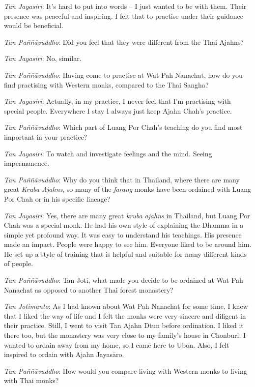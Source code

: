 \emph{Tan Jayasiri}: It's hard to put into words -- I just wanted to be
with them. Their presence was peaceful and inspiring. I felt that to
practise under their guidance would be beneficial.

\emph{Tan Paññāvuddho}‎: Did you feel that they were different from the
Thai Ajahns?

\emph{Tan Jayasiri}: No, similar.

\emph{Tan Paññāvuddho}‎: Having come to practise at Wat Pah Nanachat,
how do you find practising with Western monks, compared to the Thai
Sangha?

\emph{Tan Jayasiri}: Actually, in my practice, I never feel that I'm
practising with special people. Everywhere I stay I always just keep
Ajahn Chah's practice.

\emph{Tan Paññāvuddho}‎: Which part of Luang Por Chah's teaching do you
find most important in your practice?

\emph{Tan Jayasiri}: To watch and investigate feelings and the mind.
Seeing impermanence.

\emph{Tan Paññāvuddho}‎: Why do you think that in Thailand, where there
are many great \emph{Kruba Ajahns‎‎}, so many of the \emph{farang} monks
have been ordained with Luang Por Chah or in his specific lineage?

\emph{Tan Jayasiri}: Yes, there are many great \emph{kruba}
\emph{ajahns} in Thailand, but Luang Por Chah was a special monk. He had
his own style of explaining the Dhamma in a simple yet profound way. It
was easy to understand his teachings. His presence made an impact.
People were happy to see him. Everyone liked to be around him. He set up
a style of training that is helpful and suitable for many different
kinds of people.

\emph{Tan Paññāvuddho}‎: Tan Joti, what made you decide to be ordained
at Wat Pah Nanachat as opposed to another Thai forest monastery?

\emph{Tan Jotimanto}: As I had known about Wat Pah Nanachat for some
time, I knew that I liked the way of life and I felt the monks were very
sincere and diligent in their practice. Still, I went to visit Tan Ajahn
Dtun before ordination. I liked it there too, but the monastery was very
close to my family's house in Chonburi. I wanted to ordain away from my
home, so I came here to Ubon. Also, I felt inspired to ordain with Ajahn
Jayasāro.

\emph{Tan Paññāvuddho}‎: How would you compare living with Western monks
to living with Thai monks?

